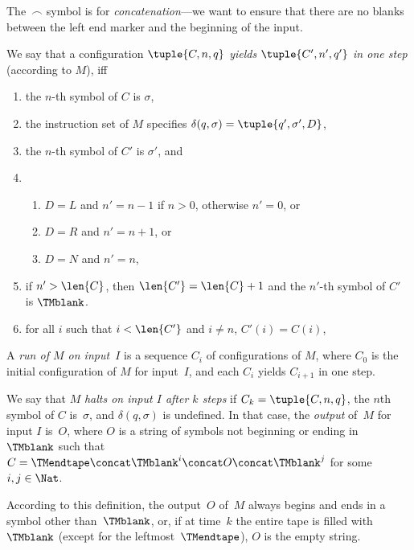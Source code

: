 \documentclass[../../../include/open-logic-section]{subfiles}
\begin{document}
\begin{explain}
The~$\frown$ symbol is for \emph{concatenation}---we want to
ensure that there are no blanks between the left end marker and
the beginning of the input.
\end{explain}

\begin{defn}
We say that a configuration $\tuple{C, n, q}$ \emph{yields
  $\tuple{C', n', q'}$ in one step} (according to $M$), iff
\begin{enumerate}
\item the $n$-th symbol of $C$ is $\sigma$,
\item the instruction set of $M$ specifies $\delta(q, \sigma) =
  \tuple{q', \sigma', D}$,
\item the $n$-th symbol of $C'$ is $\sigma'$, and 
\item
\begin{enumerate}
\item $D = L$ and $n' = n - 1$ if $n>0$, otherwise $n'=0$, or
\item $D = R$ and $n' = n + 1$, or
\item $D = N$ and $n' = n$,
\end{enumerate}
\item if $n' > \len{C}$, then $\len{C'} = \len{C} + 1$ and the $n'$-th
  symbol of $C'$ is $\TMblank$.
\item for all $i$ such that $i < \len{C'}$ and $i \neq n$, $C'(i) = C(i)$,
\end{enumerate}
\end{defn}

\begin{defn}
A \emph{run of $M$ on input~$I$} is a sequence $C_i$ of configurations
of $M$, where $C_0$ is the initial configuration of $M$ for input~$I$,
and each $C_i$ yields $C_{i+1}$ in one step.

We say that $M$ \emph{halts on input $I$ after $k$ steps} if $C_k =
\tuple{C, n, q}$, the $n$th symbol of $C$ is~$\sigma$, and $\delta(q,
\sigma)$ is undefined.  In that case, the \emph{output} of~$M$ for
input $I$ is~$O$, where $O$ is a string of symbols not beginning or
ending in~$\TMblank$ such that $C = \TMendtape \concat \TMblank^i
\concat O \concat \TMblank^j$ for some~$i, j \in \Nat$.
\end{defn}

\begin{explain}
According to this definition, the output~$O$ of~$M$ always begins and
ends in a symbol other than~$\TMblank$, or, if at time~$k$ the entire
tape is filled with~$\TMblank$ (except for the leftmost~$\TMendtape$),
$O$ is the empty string.
\end{explain}
\end{document}
